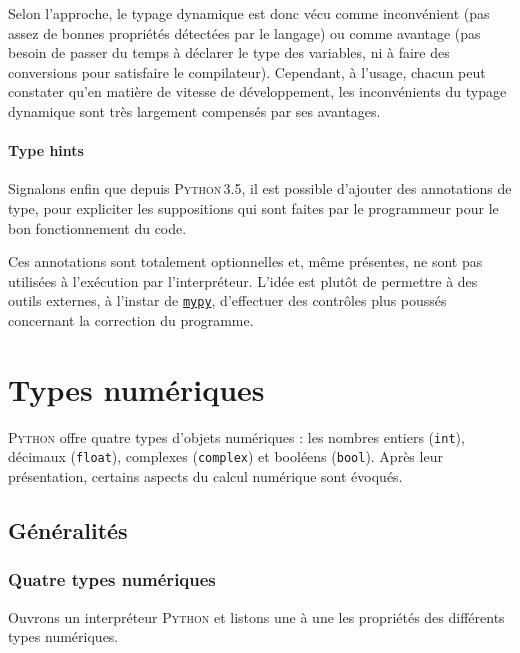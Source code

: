 Selon l'approche, le typage dynamique est donc vécu comme inconvénient (pas assez de bonnes propriétés détectées par le langage) ou comme avantage (pas besoin de passer du temps à déclarer le type des variables, ni à faire des conversions pour satisfaire le compilateur).
Cependant, à l'usage, chacun peut constater qu'en matière de vitesse de développement, les inconvénients du typage dynamique sont très largement compensés par ses avantages.

\paragraph{Type {\normalfont\ttfamily hints}} Signalons enfin que depuis \textsc{Python\,3.5}, il est possible d'ajouter des annotations de type, pour expliciter les suppositions qui sont faites par le programmeur pour le bon fonctionnement du code.

Ces annotations sont totalement optionnelles et, même présentes, ne sont pas utilisées à l'exécution par l'interpréteur. L'idée est plutôt de permettre à des outils externes, à l'instar de \href{http://mypy-lang.org/}{\texttt{mypy}}, d'effectuer des contrôles plus poussés concernant la correction du programme.



\section[Types numériques]{Types numériques}
\label{sec:X.3}

\textsc{Python} offre quatre types d'objets numériques : les nombres entiers (\texttt{int}), décimaux (\texttt{float}), complexes (\texttt{complex}) et booléens (\texttt{bool}). Après leur présentation, certains aspects du calcul numérique sont évoqués.

\vspace{-6pt}
\subsection[Généralités]{Généralités}
\label{sub:X.3.1}


\subsubsection[Quatre types numériques]{Quatre types numériques}
\label{subsub:X.3.1.1}

Ouvrons un interpréteur \textsc{Python} et listons une à une les propriétés des différents types numériques.

